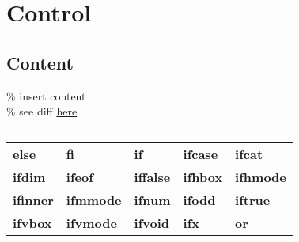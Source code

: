 \section{Control}

\subsection*{Content}
 \% insert content \\
 \% see diff \href{https://tex.stackexchange.com/questions/246/when-should-i-use-input-vs-include}{here} \\



\subsection*{}

{\scriptsize\begin{tabular}{@{}l l l l l}
    \textbf{else}            &
    \textbf{fi}              &
    \textbf{if}              &
    \textbf{ifcase}          &
    \textbf{ifcat}           \\
    \textbf{ifdim}           &
    \textbf{ifeof}           &
    \textbf{iffalse}         &
    \textbf{ifhbox}          &
    \textbf{ifhmode}         \\
    \textbf{ifinner}         &
    \textbf{ifmmode}         &
    \textbf{ifnum}           &
    \textbf{ifodd}           &
    \textbf{iftrue}          \\
    \textbf{ifvbox}          &
    \textbf{ifvmode}         &
    \textbf{ifvoid}          &
    \textbf{ifx}             &
    \textbf{or}              \\
\end{tabular}} \\


\subsection*{}

